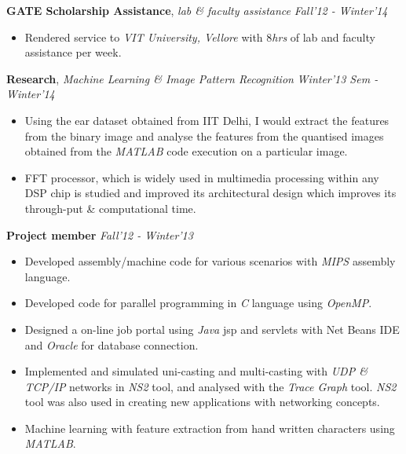 \documentclass[9pt]{article}
\newenvironment{changemargin}[2]{%
  \begin{list}{}{%
    \setlength{\topsep}{0pt}%
    \setlength{\leftmargin}{#1}%
    \setlength{\rightmargin}{#2}%
    \setlength{\listparindent}{\parindent}%
    \setlength{\itemindent}{\parindent}%
    \setlength{\parsep}{\parskip}%
  }%
  \item[]}{\end{list}
}
\newenvironment{body} {
	\vspace*{-16pt}
	\begin{changemargin}{-0.25in}{-0.5in}
  }	
	{\end{changemargin}
}
\begin{document}
\begin{body}
	\vspace{14pt}
	\textbf{GATE Scholarship Assistance}, \emph{lab \& faculty assistance} \hfill \emph{Fall'12 - Winter'14} \\
	\begin{itemize}
	\item Rendered service to \emph{VIT University, Vellore} with 8\emph{hrs} of lab and faculty assistance per week.
	\end{itemize}
	\medskip
		
	\textbf{Research}, \emph{Machine Learning \& Image Pattern Recognition} \hfill \emph{Winter'13 Sem - Winter'14} \\
	\begin{itemize}
	\item Using the ear dataset obtained from IIT Delhi, I would extract the features from the binary image and analyse the features from the quantised images obtained from the \emph{MATLAB} code execution on a particular image.
	\item FFT  processor, which is widely used in multimedia processing within any DSP chip is studied and improved its architectural design which improves its through-put \& computational time.
	\end{itemize}
\medskip
	
	\textbf{Project member} \hfill \emph{Fall'12 - Winter'13} \\
	\begin{itemize}
	\item Developed assembly/machine code for various scenarios with \emph{MIPS} assembly language.
	\item Developed code for parallel programming in \emph{C} language using \emph{OpenMP}.
	\item Designed a on-line job portal using \emph{Java} jsp and servlets with Net Beans IDE and \emph{Oracle} for database connection.
	\item Implemented and simulated uni-casting and multi-casting with \emph{UDP \& TCP/IP} networks in \emph{NS2} tool, and analysed with the \emph{Trace Graph} tool. \emph{NS2} tool was also used in creating new applications with networking concepts.
	\item Machine learning with feature extraction from hand written characters using \emph{MATLAB}.
	\end{itemize}

\end{body}
\end{document}
